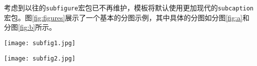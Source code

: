 考虑到以往的\texttt{subfigure}宏包已不再维护，模板将默认使用更加现代的\texttt{subcaption}宏包。图\ref{fig:figures}展示了一个基本的分图示例，其中具体的分图如分图\ref{fig:a}和分图\ref{fig:b}所示。

\begin{figure*}[!h]
  \centering
  \begin{minipage}{0.4\linewidth}
    \centering
    \texttt{[image: subfig1.jpg]}
      \label{fig:a}
  \end{minipage}
  \begin{minipage}{0.4\linewidth}
    \centering
    \texttt{[image: subfig2.jpg]}
      \label{fig:b}
  \end{minipage}
  \caption{涂层在冷却过程中残余热应力的变化情况}
  \label{fig:figures}
\end{figure*}